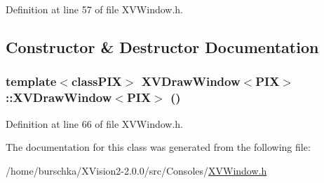 Definition at line 57 of file XVWindow.h.

\subsection{Constructor \& Destructor Documentation}
\label{XVDrawWindow_a0}
\hypertarget{class_XVDrawWindow_a0}{
\subsubsection[XVDrawWindow]{\setlength{\rightskip}{0pt plus 5cm}template$<$classPIX$>$ XVDraw\-Window$<$PIX$>$::XVDraw\-Window$<$PIX$>$ ()}}




Definition at line 66 of file XVWindow.h.

The documentation for this class was generated from the following file:\begin{CompactItemize}
\item 
/home/burschka/XVision2-2.0.0/src/Consoles/\hyperlink{XVWindow.h-source}{XVWindow.h}\end{CompactItemize}

